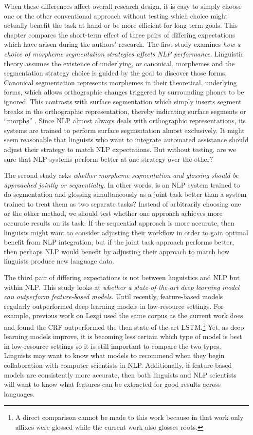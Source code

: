 When these differences affect overall research design, it is easy to simply choose one or the other conventional approach without testing which choice might actually benefit the task at hand or be more efficient for long-term goals. This chapter compares the short-term effect of three pairs of differing expectations which have arisen during the authors' research. 
The first study examines \textit{how a choice of morpheme segmentation strategies affects NLP performance}. Linguistic theory assumes the existence of underlying, or canonical, morphemes and the segmentation strategy choice is guided by the goal to discover those forms. Canonical segmentation represents morphemes in their theoretical, underlying forms, which allows orthographic changes triggered by surrounding phones to be ignored. This contrasts with surface segmentation which simply inserts segment breaks in the orthographic representation, thereby indicating surface segments or ``morphs'' \citep{virpioja_empirical_2011}. Since NLP almost always deals with orthographic representations, its systems are trained to perform surface segmentation almost exclusively. 
It might seem reasonable that linguists who want to integrate automated assistance should adjust their strategy to match NLP expectations. But without testing, are we sure that NLP systems perform better at one strategy over the other?

The second study asks \textit{whether morpheme segmentation and glossing should be approached jointly or sequentially}. In other words, is an NLP system trained to do segmentation and glossing simultaneously as a joint task better than a system trained to treat them as two separate tasks? Instead of arbitrarily choosing one or the other method, we should test whether one approach achieves more accurate results on its task. If the sequential approach is more accurate, then linguists might want to consider adjusting their workflow in order to gain optimal benefit from NLP integration, but if the joint task approach performs better, then perhaps NLP would benefit by adjusting their approach to match how linguists produce new language data.

The third pair of differing expectations is not between linguistics and NLP but within NLP. This study looks at \textit{whether a state-of-the-art deep learning model can outperform feature-based models.} Until recently, feature-based models regularly outperformed deep learning models in low-resource settings. For example, previous work on Lezgi \citep{moeller_automatic_2018} used the same corpus as the current work does and found the CRF outperformed the then state-of-the-art LSTM.\footnote{A direct comparison cannot be made to this work because in that work only affixes were glossed while the current work also glosses roots.} Yet, as deep learning models improve, it is becoming less certain which type of model is best in low-resource settings so it is still important to compare the two types. Linguists may want to know what models to recommend when they begin collaboration with computer scientists in NLP. Additionally, if feature-based models are consistently more accurate, then both linguists and NLP scientists will want to know what features can be extracted for good results across languages. 

